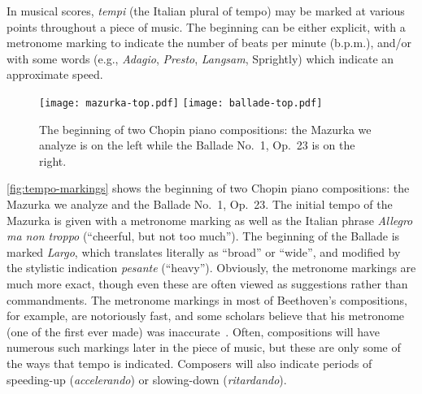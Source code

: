 \documentclass[12pt]{article}
\begin{document}
In musical scores, {\em tempi} (the Italian plural of tempo) may be
marked at various points throughout a piece of music. The
beginning can be either explicit, with a metronome marking to
indicate the number of beats per minute (b.p.m.), and/or with some words
(e.g., {\em Adagio}, {\em Presto}, {\em Langsam}, Sprightly) which indicate an
approximate speed. 
\begin{figure}[t!]
  \centering
  \texttt{[image: mazurka-top.pdf]}
  \texttt{[image: ballade-top.pdf]}
  \caption{The beginning of two Chopin piano compositions: the Mazurka
    we analyze is on the left while the Ballade No.\ 1, Op.\ 23 is on
    the right.}
  \label{fig:tempo-markings}
\end{figure}
\autoref{fig:tempo-markings} shows the beginning of two Chopin piano
compositions: the Mazurka we analyze and the Ballade No.\ 1, Op.\
23. The initial tempo of the Mazurka is given with a metronome
marking as well as the Italian phrase {\em Allegro ma non troppo}
(``cheerful, but not too much''). The beginning of the Ballade is 
marked {\em Largo}, which translates literally as ``broad'' or
``wide'', and modified by the stylistic indication {\em pesante}
(``heavy''). Obviously, the metronome markings are much more exact,
though even these are often viewed as suggestions rather than
commandments. The metronome markings in most of Beethoven's
compositions, for example, are notoriously fast, and some scholars
believe that his metronome (one of the first ever made) was
inaccurate~\citep{ForsenGray2013}. Often, compositions will have numerous such markings later
in the piece of music, but these are only some of the ways that tempo
is indicated. Composers will also indicate periods of speeding-up
(\emph{accelerando}) or
slowing-down (\emph{ritardando}).
\end{document}
